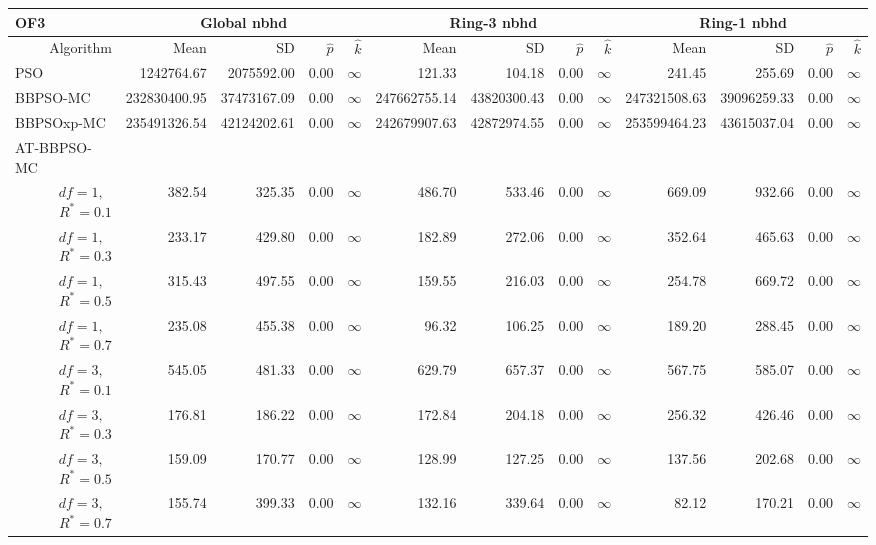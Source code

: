 \documentclass[cmbright]{staauth}
\begin{document}
\begin{table}[ht]
\centering
\tiny{
\begin{tabular}{r|rrrr|rrrr|rrrr}
\multicolumn{1}{l}{OF3} & \multicolumn{4}{c}{Global nbhd} & \multicolumn{4}{c}{Ring-3 nbhd} & \multicolumn{4}{c}{Ring-1 nbhd}\\
  \hline
Algorithm & Mean & SD & $\widehat{p}$ & $\widehat{k}$ & Mean & SD & $\widehat{p}$ & $\widehat{k}$ & Mean & SD & $\widehat{p}$ & $\widehat{k}$ \\
  \hline
\multicolumn{1}{l|}{PSO} & 1242764.67 & 2075592.00 & 0.00 & $\infty$ & 121.33 & 104.18 & 0.00 & $\infty$ & 241.45 & 255.69 & 0.00 & $\infty$ \\
  \multicolumn{1}{l|}{BBPSO-MC} & 232830400.95 & 37473167.09 & 0.00 & $\infty$ & 247662755.14 & 43820300.43 & 0.00 & $\infty$ & 247321508.63 & 39096259.33 & 0.00 & $\infty$ \\
  \multicolumn{1}{l|}{BBPSOxp-MC} & 235491326.54 & 42124202.61 & 0.00 & $\infty$ & 242679907.63 & 42872974.55 & 0.00 & $\infty$ & 253599464.23 & 43615037.04 & 0.00 & $\infty$ \\
\hline
\multicolumn{1}{l|}{AT-BBPSO-MC} &&&&&&&&&&&&\\
  $df = 1,\enspace$ $R^* =0.1$ & 382.54 & 325.35 & 0.00 & $\infty$ & 486.70 & 533.46 & 0.00 & $\infty$ & 669.09 & 932.66 & 0.00 & $\infty$ \\
  $df = 1,\enspace$ $R^* =0.3$ & 233.17 & 429.80 & 0.00 & $\infty$ & 182.89 & 272.06 & 0.00 & $\infty$ & 352.64 & 465.63 & 0.00 & $\infty$ \\
  $df = 1,\enspace$ $R^* =0.5$ & 315.43 & 497.55 & 0.00 & $\infty$ & 159.55 & 216.03 & 0.00 & $\infty$ & 254.78 & 669.72 & 0.00 & $\infty$ \\
  $df = 1,\enspace$ $R^* =0.7$ & 235.08 & 455.38 & 0.00 & $\infty$ & 96.32 & 106.25 & 0.00 & $\infty$ & 189.20 & 288.45 & 0.00 & $\infty$ \\
  $df = 3,\enspace$ $R^* =0.1$ & 545.05 & 481.33 & 0.00 & $\infty$ & 629.79 & 657.37 & 0.00 & $\infty$ & 567.75 & 585.07 & 0.00 & $\infty$ \\
  $df = 3,\enspace$ $R^* =0.3$ & 176.81 & 186.22 & 0.00 & $\infty$ & 172.84 & 204.18 & 0.00 & $\infty$ & 256.32 & 426.46 & 0.00 & $\infty$ \\
  $df = 3,\enspace$ $R^* =0.5$ & 159.09 & 170.77 & 0.00 & $\infty$ & 128.99 & 127.25 & 0.00 & $\infty$ & 137.56 & 202.68 & 0.00 & $\infty$ \\
  $df = 3,\enspace$ $R^* =0.7$ & 155.74 & 399.33 & 0.00 & $\infty$ & 132.16 & 339.64 & 0.00 & $\infty$ & 82.12 & 170.21 & 0.00 & $\infty$ \\

\end{tabular}}
\end{table}
\end{document}
